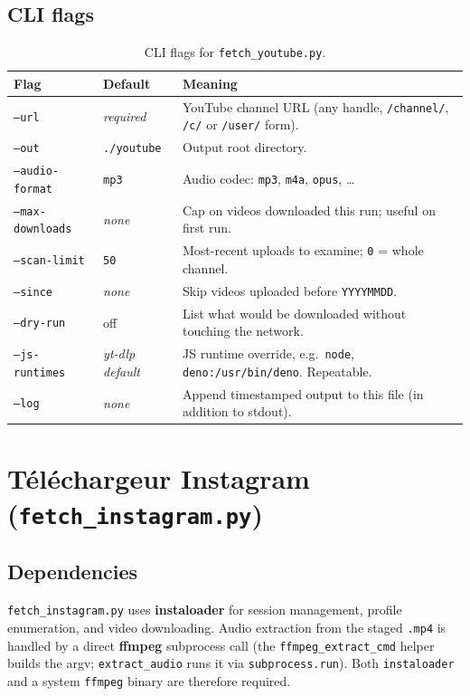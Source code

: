\documentclass[11pt,a4paper]{report}
\newcommand{\code}[1]{\texttt{\small #1}}
\begin{document}
\subsection{CLI flags}

\begin{table}[ht]
\centering
\small
\renewcommand{\arraystretch}{1.25}
\begin{tabularx}{\textwidth}{@{}l l X@{}}
\toprule
\textbf{Flag} & \textbf{Default} & \textbf{Meaning} \\
\midrule
\code{--url} & \emph{required} & YouTube channel URL (any handle, \texttt{/channel/}, \texttt{/c/} or \texttt{/user/} form). \\
\code{--out} & \code{./youtube} & Output root directory. \\
\code{--audio-format} & \code{mp3} & Audio codec: \code{mp3}, \code{m4a}, \code{opus}, \ldots \\
\code{--max-downloads} & \emph{none} & Cap on videos downloaded this run; useful on first run. \\
\code{--scan-limit} & \code{50} & Most-recent uploads to examine; \code{0} = whole channel. \\
\code{--since} & \emph{none} & Skip videos uploaded before \code{YYYYMMDD}. \\
\code{--dry-run} & off & List what would be downloaded without touching the network. \\
\code{--js-runtimes} & \emph{yt-dlp default} & JS runtime override, e.g.\ \code{node}, \code{deno:/usr/bin/deno}. Repeatable. \\
\code{--log} & \emph{none} & Append timestamped output to this file (in addition to stdout). \\
\bottomrule
\end{tabularx}
\caption{CLI flags for \texttt{fetch\_youtube.py}.}
\label{tab:yt-flags}
\end{table}

\section{Téléchargeur Instagram (\texttt{fetch\_instagram.py})}

\subsection{Dependencies}

\texttt{fetch\_instagram.py} uses \textbf{instaloader} for session management,
profile enumeration, and video downloading.  Audio extraction from the staged
\code{.mp4} is handled by a direct \textbf{ffmpeg} subprocess call (the
\code{ffmpeg\_extract\_cmd} helper builds the argv; \code{extract\_audio} runs it
via \code{subprocess.run}).  Both \code{instaloader} and a system \code{ffmpeg}
binary are therefore required.
\end{document}
